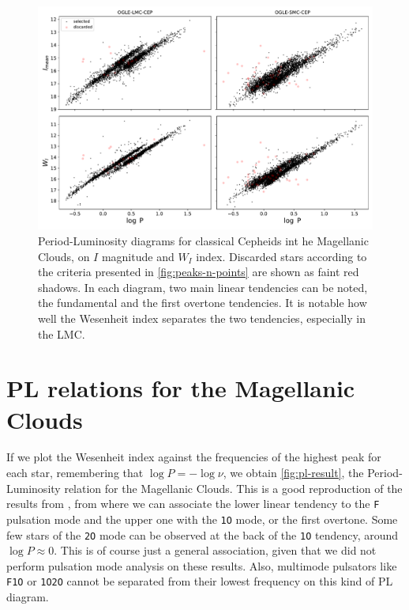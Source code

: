 \begin{figure}
	\centering
	\includegraphics[width=\textwidth]{img/PL_realtion.pdf}
	\caption[Results: PL relation for the Magellanic Clouds]{
		Period-Luminosity diagrams for classical Cepheids int he Magellanic Clouds, on $I$ magnitude and $W_I$ index.
		Discarded stars according to the criteria presented in \autoref{fig:peaks-n-points} are shown as faint red shadows.
		In each diagram, two main linear tendencies can be noted, the fundamental and the first overtone tendencies.
		It is notable how well the Wesenheit index separates the two tendencies, especially in the LMC.
	}
	\label{fig:pl-result}
\end{figure}

\section{PL relations for the Magellanic Clouds}

If we plot the Wesenheit index against the frequencies of the highest peak for each star, remembering that $\log P=-\log \nu$, we obtain \autoref{fig:pl-result},
the Period-Luminosity relation for the Magellanic Clouds. This is a good reproduction of the results from \cite{OGLE2016}, 
from where we can associate the lower linear tendency to the \texttt{F} pulsation mode and the upper one with the \texttt{1O} mode, or the first overtone.
Some few stars of the \texttt{2O} mode can be observed at the back of the \texttt{1O} tendency, around $\log P\approx 0$.
This is of course just a general association, given that we did not perform pulsation mode analysis on these results.
Also, multimode pulsators like \texttt{F1O} or \texttt{1O2O} cannot be separated from their lowest frequency on this kind of PL diagram.

